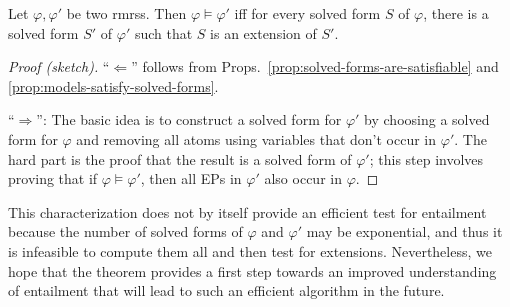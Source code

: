 \begin{thm}\label{thm:big-one}
  Let $\varphi, \varphi'$ be two {\sc rmrs}s.  Then $\varphi \models
  \varphi'$ iff for every solved form $S$ of $\varphi$, there is a
  solved form $S'$ of $\varphi'$ such that $S$ is an extension of
  $S'$.   
\end{thm}
\begin{proof}[Proof (sketch)]
``$\Leftarrow$'' follows from
Props.~\ref{prop:solved-forms-are-satisfiable} and
\ref{prop:models-satisfy-solved-forms}.

``$\Rightarrow$'': The basic idea is to construct a solved form for
$\varphi'$ by choosing a solved form for $\varphi$ and removing all
atoms using variables that don't occur in $\varphi'$.  The hard part
is the proof that the result is a solved form of $\varphi'$; this step
involves proving that if $\varphi \models \varphi'$, then all EPs in
$\varphi'$ also occur in $\varphi$.  
\end{proof}

This characterization does not by itself provide an efficient test for
entailment because the number of solved forms of $\varphi$ and
$\varphi'$ may be exponential, and thus it is infeasible to compute
them all and then test for extensions.  Nevertheless, we hope that the
theorem provides a first step towards an improved understanding of
entailment that will lead to such an efficient algorithm in the
future.


